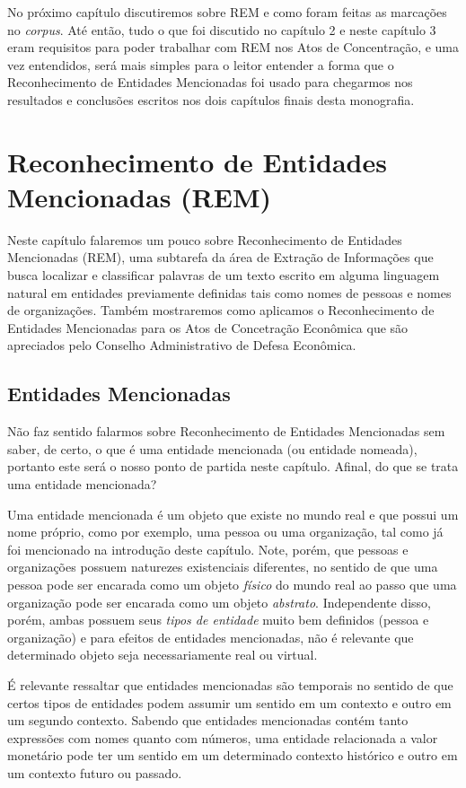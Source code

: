 \documentclass[11pt]{report}
\begin{document}
No próximo capítulo discutiremos sobre REM e como foram feitas as marcações no \textit{corpus}. Até então, tudo o que foi discutido no capítulo 2 e neste capítulo 3 eram
requisitos para poder trabalhar com REM nos Atos de Concentração, e uma vez entendidos, será mais simples para o leitor entender a forma que o Reconhecimento de Entidades
Mencionadas foi usado para chegarmos nos resultados e conclusões escritos nos dois capítulos finais desta monografia.

\pagebreak
\chapter{Reconhecimento de Entidades Mencionadas (REM)}

\indent\indent Neste capítulo falaremos um pouco sobre Reconhecimento de Entidades Mencionadas (REM), uma subtarefa da área de Extração de Informações que busca localizar e classificar
palavras de um texto escrito em alguma linguagem natural em entidades previamente definidas tais como nomes de pessoas e nomes de organizações. Também mostraremos como
aplicamos o Reconhecimento de Entidades Mencionadas para os Atos de Concetração Econômica que são apreciados pelo Conselho Administrativo de Defesa Econômica.

\section{Entidades Mencionadas}

\indent\indent Não faz sentido falarmos sobre Reconhecimento de Entidades Mencionadas sem saber, de certo, o que é uma entidade mencionada (ou entidade nomeada), portanto este
será o nosso ponto de partida neste capítulo. Afinal, do que se trata uma entidade mencionada?

Uma entidade mencionada é um objeto que existe no mundo real e que possui um nome próprio, como por exemplo, uma pessoa ou uma organização, tal como já foi mencionado na introdução
deste capítulo. Note, porém, que pessoas e organizações possuem naturezes existenciais diferentes, no sentido de que uma pessoa pode ser encarada como um objeto \textit{físico} do mundo real
ao passo que uma organização pode ser encarada como um objeto \textit{abstrato}. Independente disso, porém, ambas possuem seus \textit{tipos de entidade} muito bem definidos
(pessoa e organização) e para efeitos de entidades mencionadas, não é relevante que determinado objeto seja necessariamente real ou virtual.

É relevante ressaltar que entidades mencionadas são temporais no sentido de que certos tipos de entidades podem assumir um sentido em um contexto e outro em um segundo contexto.
Sabendo que entidades mencionadas contém tanto expressões com nomes quanto com números, uma entidade relacionada a valor monetário pode ter um sentido em um determinado
contexto histórico e outro em um contexto futuro ou passado.
\end{document}
